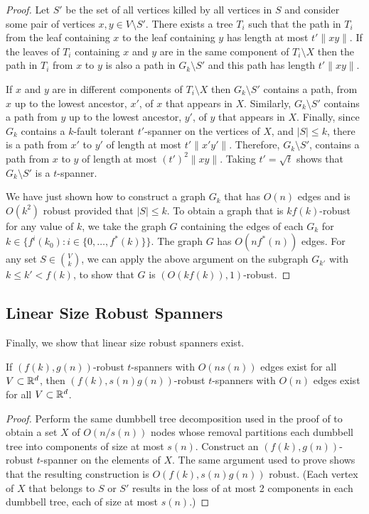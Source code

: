 \documentclass{patmorin}
\begin{document}
\begin{proof}
  Let $S'$ be the set of all vertices killed by all vertices in $S$ and
  consider some pair of vertices $x,y\in V\setminus S'$.  There exists
  a tree $T_i$ such that the path in $T_i$ from the leaf containing $x$
  to the leaf containing $y$ has length at most $t'\|xy\|$.  If the
  leaves of $T_i$ containing $x$ and $y$ are in the same component of
  $T_i\setminus X$ then the path in $T_i$ from $x$ to $y$ is also a path
  in $G_k\setminus S'$ and this path has length $t'\|xy\|$.

  If $x$ and $y$ are in different components of $T_i\setminus X$ then
  $G_k\setminus S'$ contains a path, from $x$ up to the lowest ancestor,
  $x'$, of $x$ that appears in $X$.  Similarly, $G_k\setminus S'$ contains
  a path from $y$ up to the lowest ancestor, $y'$, of $y$ that appears
  in $X$.  Finally, since $G_k$ contains a $k$-fault tolerant $t'$-spanner
  on the vertices of $X$, and $|S|\le k$, there is a path from $x'$ to
  $y'$ of length at most $t'\|x'y'\|$.  Therefore, $G_k\setminus S'$,
  contains a path from $x$ to $y$ of length at most $(t')^2\|xy\|$.
  Taking $t'=\sqrt{t}$ shows that $G_k\setminus S'$ is a $t$-spanner.

  We have just shown how to construct a graph $G_k$ that has $O(n)$
  edges and is $O(k^2)$ robust provided that $|S|\le k$.  To obtain
  a graph that is $kf(k)$-robust for any value of $k$, we take the
  graph $G$ containing the edges of each $G_k$ for $k\in\{f^i(k_0) :
  i\in\{0,\ldots,f^*(k)\}\}$.  The graph $G$ has $O(nf^*(n))$ edges.
  For any set $S\in \binom{V}{k}$, we can apply the above argument
  on the subgraph $G_{k'}$ with $k \le k' < f(k)$, to show that $G$
  is $(O(kf(k)),1)$-robust.
\end{proof}

\subsection{Linear Size Robust Spanners}

Finally, we show that linear size robust spanners exist.

\begin{thm}
  If $(f(k),g(n))$-robust $t$-spanners with $O(n s(n))$ edges exist for
  all $V\subset\mathbb{R}^d$, then $(f(k),s(n)g(n))$-robust $t$-spanners with
  $O(n)$ edges exist for all $V\subset\mathbb{R}^d$.
\end{thm}

\begin{proof}
  Perform the same dumbbell tree decomposition used in the proof of
   to obtain a set $X$ of $O(n/s(n))$ nodes whose removal
  partitions each dumbbell tree into components of size at most $s(n)$.
  Construct an $(f(k),g(n))$-robust $t$-spanner on the elements of $X$.
  The same argument used to prove  shows that the resulting
  construction is $O(f(k),s(n)g(n))$ robust.  (Each vertex of $X$ that
  belongs to $S$ or $S'$ results in the loss of at most 2 components in
  each dumbbell tree, each of size at most $s(n)$.)
\end{proof}
\end{document}
